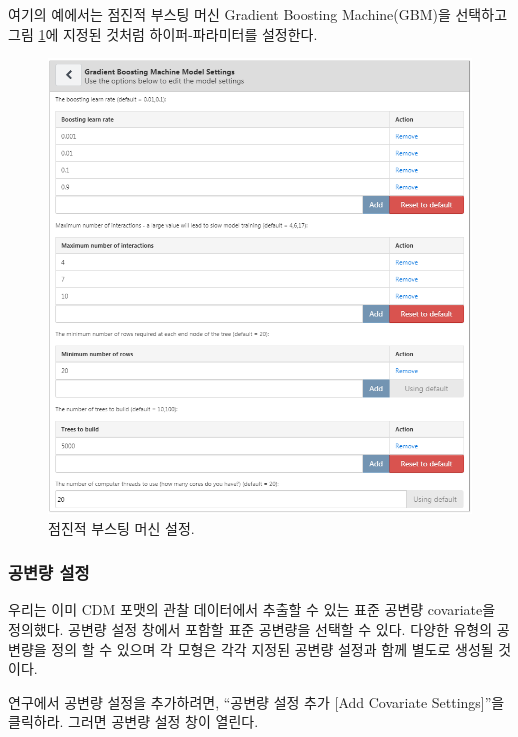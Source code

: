 \documentclass[10.5pt]{book}
\theoremstyle{definition}
\theoremstyle{definition}
\theoremstyle{definition}
\theoremstyle{remark}
\begin{document}
여기의 예에서는 점진적 부스팅 머신 Gradient Boosting Machine(GBM)을
선택하고 그림 \ref{fig:gbmSettings}에 지정된 것처럼 하이퍼-파라미터를
설정한다.

\begin{figure}

{\centering \includegraphics[width=1\linewidth]{images/PatientLevelPrediction/gbmSettings} 

}

\caption{점진적 부스팅 머신 설정.}\label{fig:gbmSettings}
\end{figure}

\subsubsection*{공변량 설정}\label{--1}

우리는 이미 CDM 포맷의 관찰 데이터에서 추출할 수 있는 표준 공변량
covariate을 정의했다. 공변량 설정 창에서 포함할 표준 공변량을 선택할 수
있다. 다양한 유형의 공변량을 정의 할 수 있으며 각 모형은 각각 지정된
공변량 설정과 함께 별도로 생성될 것이다.

연구에서 공변량 설정을 추가하려면, ``공변량 설정 추가 {[}Add Covariate
Settings{]}''을 클릭하라. 그러면 공변량 설정 창이 열린다.
\end{document}

